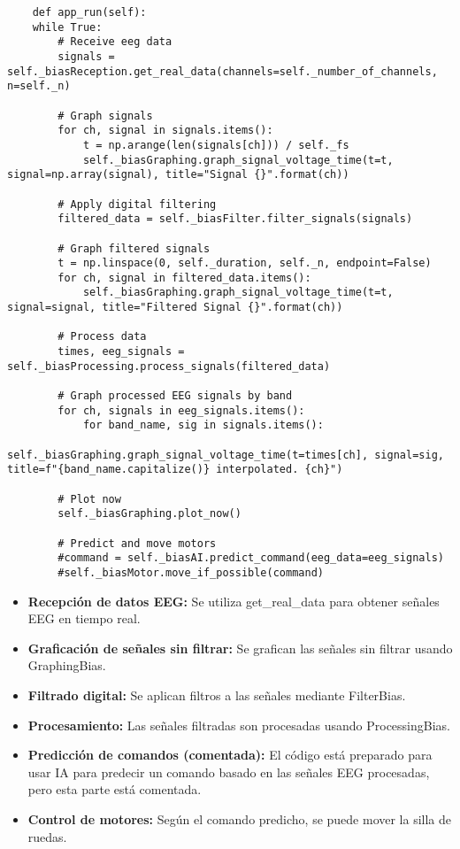 \documentclass{article}
\begin{document}
\begin{lstlisting}
    def app_run(self):
    while True:
        # Receive eeg data
        signals = self._biasReception.get_real_data(channels=self._number_of_channels, n=self._n)
        
        # Graph signals
        for ch, signal in signals.items():
            t = np.arange(len(signals[ch])) / self._fs
            self._biasGraphing.graph_signal_voltage_time(t=t, signal=np.array(signal), title="Signal {}".format(ch))
        
        # Apply digital filtering
        filtered_data = self._biasFilter.filter_signals(signals)
        
        # Graph filtered signals
        t = np.linspace(0, self._duration, self._n, endpoint=False)
        for ch, signal in filtered_data.items():
            self._biasGraphing.graph_signal_voltage_time(t=t, signal=signal, title="Filtered Signal {}".format(ch))
        
        # Process data
        times, eeg_signals = self._biasProcessing.process_signals(filtered_data)
        
        # Graph processed EEG signals by band
        for ch, signals in eeg_signals.items():
            for band_name, sig in signals.items():
                self._biasGraphing.graph_signal_voltage_time(t=times[ch], signal=sig, title=f"{band_name.capitalize()} interpolated. {ch}")
        
        # Plot now
        self._biasGraphing.plot_now()

        # Predict and move motors
        #command = self._biasAI.predict_command(eeg_data=eeg_signals)
        #self._biasMotor.move_if_possible(command)
\end{lstlisting}
\begin{itemize}
    \item \textbf{Recepción de datos EEG:} Se utiliza get\_real\_data para obtener señales EEG en tiempo real.
    \item \textbf{Graficación de señales sin filtrar:} Se grafican las señales sin filtrar usando GraphingBias.
    \item \textbf{Filtrado digital:} Se aplican filtros a las señales mediante FilterBias.
    \item \textbf{Procesamiento:} Las señales filtradas son procesadas usando ProcessingBias.
    \item \textbf{Predicción de comandos (comentada):} El código está preparado para usar IA para predecir un comando basado en las señales EEG procesadas, pero esta parte está comentada.
    \item \textbf{Control de motores:} Según el comando predicho, se puede mover la silla de ruedas.
\end{itemize}
\end{document}
